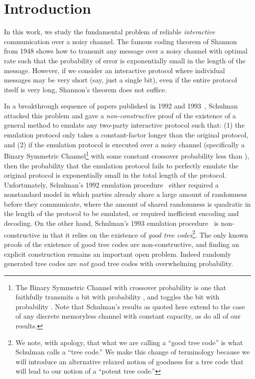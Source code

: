 \documentclass[ letterpaper, 11pt]{article}
\newcommand{\potent}{potent\xspace}
\begin{document}
\thispagestyle{empty}   \newpage
\setcounter{page}{1}









\section{Introduction}


In this work, we study the fundamental problem of reliable
\emph{interactive} communication over a noisy channel.  The famous
coding theorem of Shannon~\cite{shannon48} from 1948 shows how to
transmit any message over a noisy channel with optimal rate such
that the probability of error is exponentially small in the length
of the message.  However, if we consider an interactive protocol
where individual messages may be very short (say, just a single
bit), even if the entire protocol itself is very long, Shannon's
theorem does not suffice.

In a breakthrough sequence of papers published in 1992 and
1993~\cite{schulman92,schulman93}, Schulman attacked this problem
and gave a \emph{non-constructive} proof of the existence of a
general method to emulate any two-party interactive protocol such
that: (1) the emulation protocol only takes a constant-factor longer
than the original protocol, and (2) if the emulation protocol is
executed over a noisy channel (specifically a Binary Symmetric
Channel\footnote{The Binary Symmetric Channel with crossover
probability  is one that faithfully transmits a bit with
probability , and toggles the bit with probability .  Note
that Schulman's results as quoted here extend to the case of any
discrete memoryless channel with constant capacity, as do all of our
results.} with some constant crossover probability less than
), then the probability that the emulation protocol fails
to perfectly emulate the original protocol 
is exponentially small in the total length of the protocol.
Unfortunately, Schulman's 1992 emulation procedure~\cite{schulman92}
either required a nonstandard model in which parties already share a
large amount of randomness before they communicate, where the amount
of shared randomness is quadratic in the length of the protocol to
be emulated, or required inefficient encoding and decoding. On the
other hand, Schulman's 1993 emulation procedure~\cite{schulman93}
 is non-constructive in that it
relies on the existence of \emph{good tree codes}\footnote{ We note,
with apology, that what we are calling a ``good tree code'' is what
Schulman calls a ``tree code.''  We make this change of terminology
because we will introduce an alternative relaxed notion of goodness
for a tree code that will lead to our notion of a ``\potent tree
code.'' }.  The only known proofs of the existence of good tree
codes are non-constructive, and finding an explicit construction
remains an important open problem.  Indeed randomly generated tree
codes are \emph{not} good tree codes with overwhelming probability.
\end{document}
